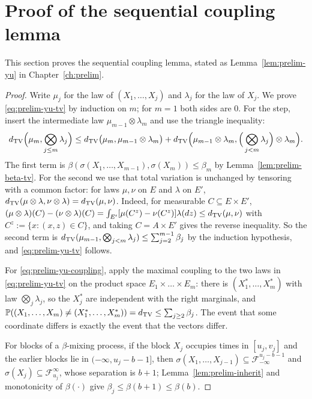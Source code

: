 \documentclass[../../main.tex]{subfiles}
\begin{document}
\section{Proof of the sequential coupling lemma}\label{appB:yu}

This section proves the sequential coupling lemma, stated as Lemma~\ref{lem:prelim-yu} in Chapter~\ref{ch:prelim}.

\begin{proof}
Write $\mu_j$ for the law of $(X_1,\dots,X_j)$ and $\lambda_j$ for the law of $X_j$. We prove \eqref{eq:prelim-yu-tv} by induction on $m$; for $m=1$ both sides are $0$. For the step, insert the intermediate law $\mu_{m-1}\otimes\lambda_m$ and use the triangle inequality:
\[
d_{\mathrm{TV}}\Big(\mu_m,\bigotimes_{j\le m}\lambda_j\Big)\le d_{\mathrm{TV}}\big(\mu_m,\mu_{m-1}\otimes\lambda_m\big)+d_{\mathrm{TV}}\Big(\mu_{m-1}\otimes\lambda_m,\Big(\bigotimes_{j<m}\lambda_j\Big)\otimes\lambda_m\Big).
\]
The first term is $\beta(\sigma(X_1,\dots,X_{m-1}),\sigma(X_m))\le\beta_m$ by Lemma~\ref{lem:prelim-beta-tv}. For the second we use that total variation is unchanged by tensoring with a common factor: for laws $\mu,\nu$ on $E$ and $\lambda$ on $E'$, $d_{\mathrm{TV}}(\mu\otimes\lambda,\nu\otimes\lambda)=d_{\mathrm{TV}}(\mu,\nu)$. Indeed, for measurable $C\subseteq E\times E'$, $(\mu\otimes\lambda)(C)-(\nu\otimes\lambda)(C)=\int_{E'}[\mu(C^{z})-\nu(C^{z})]\lambda(dz)\le d_{\mathrm{TV}}(\mu,\nu)$ with $C^z:=\{x:(x,z)\in C\}$, and taking $C=A\times E'$ gives the reverse inequality. So the second term is $d_{\mathrm{TV}}(\mu_{m-1},\bigotimes_{j<m}\lambda_j)\le\sum_{j=2}^{m-1}\beta_j$ by the induction hypothesis, and \eqref{eq:prelim-yu-tv} follows.

For \eqref{eq:prelim-yu-coupling}, apply the maximal coupling to the two laws in \eqref{eq:prelim-yu-tv} on the product space $E_1\times\dots\times E_m$: there is $(X_1^*,\dots,X_m^*)$ with law $\bigotimes_j\lambda_j$, so the $X_j^*$ are independent with the right marginals, and $\mathbb{P}((X_1,\dots,X_m)\ne(X_1^*,\dots,X_m^*))=d_{\mathrm{TV}}\le\sum_{j\ge2}\beta_j$. The event that some coordinate differs is exactly the event that the vectors differ.

For blocks of a $\beta$-mixing process, if the block $X_j$ occupies times in $[u_j,v_j]$ and the earlier blocks lie in $(-\infty,u_j-b-1]$, then $\sigma(X_1,\dots,X_{j-1})\subseteq\mathcal F_{-\infty}^{u_j-b-1}$ and $\sigma(X_j)\subseteq\mathcal F_{u_j}^{\infty}$, whose separation is $b+1$; Lemma~\ref{lem:prelim-inherit} and monotonicity of $\beta(\cdot)$ give $\beta_j\le\beta(b+1)\le\beta(b)$.
\end{proof}
\end{document}
